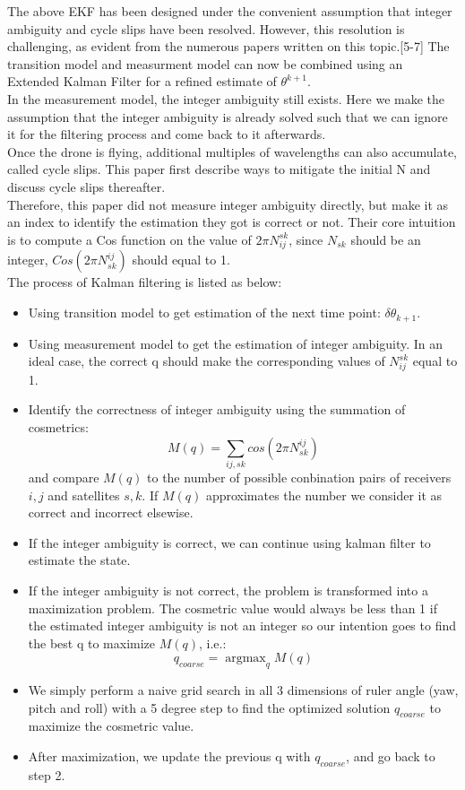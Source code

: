 \documentclass[journal,onecolumn]{IEEEtran}
\DeclareMathOperator*{\argmax}{argmax} %
\begin{document}
The above EKF has been designed under the convenient assumption that integer ambiguity and cycle slips have been resolved.
However, this resolution is challenging, as evident from the numerous papers written on this topic.[5-7]
The transition model and measurment model can now be combined using an
Extended Kalman Filter for a refined estimate of $\theta^{k+1}$.\\
In the measurement model, the integer ambiguity still exists.
Here we make the assumption that the integer ambiguity is already solved
such that we can ignore it for the filtering process and come back to it afterwards.\\
Once the drone is flying, additional multiples of wavelengths can also accumulate,
called cycle slips. This paper first describe ways to mitigate the initial N and
discuss cycle slips thereafter.\\
Therefore, this paper did not measure integer ambiguity directly, but make it as an index
to identify the estimation they got is correct or not. Their core intuition is
to compute a Cos function on the value of $2\pi N_{ij}^{sk}$,
since $N_{sk}$ should be an integer, $Cos(2\pi N_{sk}^{ij})$ should equal to 1.\\
The process of Kalman filtering is listed as below:
\begin{itemize}
\item Using transition model to get estimation of the next time point: $\delta \theta_{k+1}$.
\item Using measurement model to get the estimation of integer ambiguity.
In an ideal case, the correct q should make the corresponding values of $N_{ij}^{sk}$
equal to 1.
\item Identify the correctness of integer ambiguity using the summation of cosmetrics:
\begin{equation}
  M(q) = \sum_{ij,sk} cos(2\pi N_{sk}^{ij})
\end{equation}
and compare $M(q)$ to the number of possible conbination pairs of receivers $i,j$ and
satellites $s,k$. If $M(q)$ approximates the number we consider it as correct and incorrect
elsewise.
\item If the integer ambiguity is correct, we can continue using kalman filter
to estimate the state.
\item If the integer ambiguity is not correct, the problem is transformed into a
maximization problem. The cosmetric value would always be less than 1 if the estimated
integer ambiguity is not an integer so our intention goes to find the best q to maximize
$M(q)$, i.e.:
\begin{equation}
  q_{coarse} = \argmax_q M(q)
\end{equation}
\item We simply perform a naive grid search in all
3 dimensions of ruler angle (yaw, pitch and roll) with a 5 degree step to find the
optimized solution $q_{coarse}$ to maximize the cosmetric value.
\item After maximization, we update the previous q with $q_{coarse}$, and go back to step 2.
\end{itemize}
\end{document}

